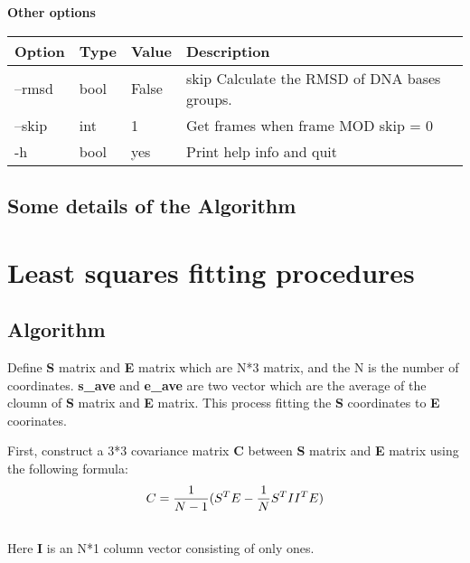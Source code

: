 \documentclass[letterpaper,10pt,english]{sphinxmanual}
\begin{document}
\textbf{Other options}

\begin{tabulary}{\linewidth}{|L|L|L|L|}
\hline
\textbf{
Option
} & \textbf{
Type
} & \textbf{
Value
} & \textbf{
Description
}\\
\hline

--rmsd
 & 
bool
 & 
False
 & 
skip Calculate the RMSD of DNA bases groups.
\\

--skip
 & 
int
 & 
1
 & 
Get frames when frame MOD skip = 0
\\

-h
 & 
bool
 & 
yes
 & 
Print help info and quit
\\
\hline
\end{tabulary}



\section{Some details of the Algorithm}
\label{documentation_pages/Parallel_analysis:some-details-of-the-algorithm}

\chapter{Least squares fitting procedures}
\label{documentation_pages/least_squares_fitting::doc}\label{documentation_pages/least_squares_fitting:least-squares-fitting-procedures}

\section{Algorithm}
\label{documentation_pages/least_squares_fitting:algorithm}
Define \textbf{S} matrix and \textbf{E} matrix which are N*3 matrix, and the N is the number of coordinates.
\textbf{s\_ave} and \textbf{e\_ave} are two vector which are the average of the cloumn of \textbf{S} matrix and \textbf{E} matrix. This process fitting the \textbf{S} coordinates to \textbf{E} coorinates.

First, construct a 3*3 covariance matrix \textbf{C} between \textbf{S} matrix and \textbf{E} matrix using the following formula:
\begin{gather}
\begin{split}C=\frac{1}{N-1}(S^T  E - \frac{1}{N} S^T  I  I^T  E)\end{split}\notag\\\begin{split}\end{split}\notag
\end{gather}
Here \textbf{I} is an N*1 column vector consisting of only ones.
\end{document}
